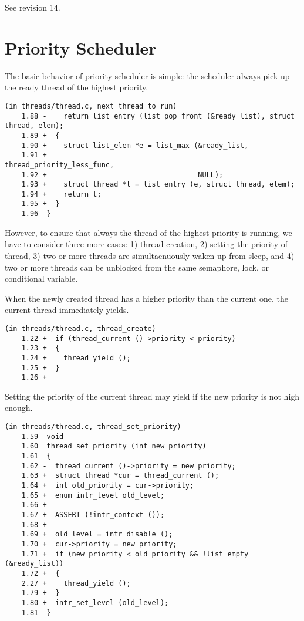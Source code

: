 \documentclass[a4paper,article,11pt,oneside]{article}
\begin{document}
See revision 14.

\section{Priority Scheduler}\label{secpriority}

The basic behavior of priority scheduler is simple: the scheduler
always pick up the ready thread of the highest priority.
\begin{verbatim}
(in threads/thread.c, next_thread_to_run)
    1.88 -    return list_entry (list_pop_front (&ready_list), struct thread, elem);
    1.89 +  {
    1.90 +    struct list_elem *e = list_max (&ready_list,
    1.91 +                                    thread_priority_less_func,
    1.92 +                                    NULL);
    1.93 +    struct thread *t = list_entry (e, struct thread, elem);
    1.94 +    return t;
    1.95 +  }
    1.96  }
\end{verbatim}

However, to ensure that always the thread of the highest priority is
running, we have to consider three more cases: 1) thread creation, 2)
setting the priority of thread, 3) two or more threads are
simultaenuously waken up from sleep, and 4) two or more threads can be
unblocked from the same semaphore, lock, or conditional variable.

When the newly created thread has a higher priority than the current
one, the current thread immediately yields.
\begin{verbatim}
(in threads/thread.c, thread_create)
    1.22 +  if (thread_current ()->priority < priority)
    1.23 +  {
    1.24 +    thread_yield ();
    1.25 +  }
    1.26 +
\end{verbatim}

Setting the priority of the current thread may yield if the new
priority is not high enough.
\begin{verbatim}
(in threads/thread.c, thread_set_priority)
    1.59  void
    1.60  thread_set_priority (int new_priority) 
    1.61  {
    1.62 -  thread_current ()->priority = new_priority;
    1.63 +  struct thread *cur = thread_current ();
    1.64 +  int old_priority = cur->priority;
    1.65 +  enum intr_level old_level;
    1.66 +  
    1.67 +  ASSERT (!intr_context ());
    1.68 +
    1.69 +  old_level = intr_disable ();
    1.70 +  cur->priority = new_priority;
    1.71 +  if (new_priority < old_priority && !list_empty (&ready_list))
    1.72 +  {
    2.27 +    thread_yield ();
    1.79 +  }
    1.80 +  intr_set_level (old_level);  
    1.81  }
\end{verbatim}
\end{document}
